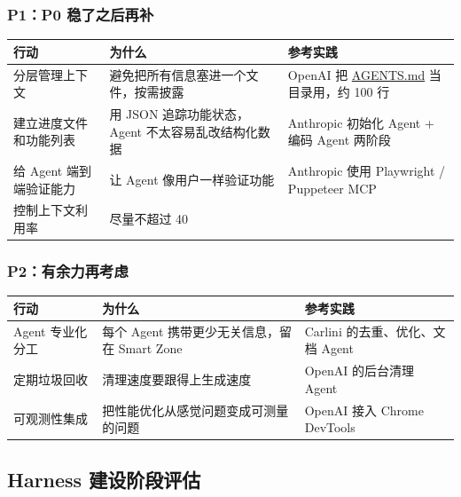 \documentclass[9pt,a4paper,twocolumn]{ctexart}
\begin{document}
\subsubsection{P1：P0 稳了之后再补}

{\footnotesize
\begin{tabular}{|p{}|p{}|p{}|}
\hline
\textbf{行动} & \textbf{为什么} & \textbf{参考实践} \\
\hline
分层管理上下文 & 避免把所有信息塞进一个文件，按需披露 & OpenAI 把 \href{http://agents.md/}{AGENTS.md} 当目录用，约 100 行 \\
\hline
建立进度文件和功能列表 & 用 JSON 追踪功能状态，Agent 不太容易乱改结构化数据 & Anthropic 初始化 Agent + 编码 Agent 两阶段 \\
\hline
给 Agent 端到端验证能力 & 让 Agent 像用户一样验证功能 & Anthropic 使用 Playwright / Puppeteer MCP \\
\hline
控制上下文利用率 & 尽量不超过 40\\%
\hline
\end{tabular}
}



\subsubsection{P2：有余力再考虑}

{\footnotesize
\begin{tabular}{|p{}|p{}|p{}|}
\hline
\textbf{行动} & \textbf{为什么} & \textbf{参考实践} \\
\hline
Agent 专业化分工 & 每个 Agent 携带更少无关信息，留在 Smart Zone & Carlini 的去重、优化、文档 Agent \\
\hline
定期垃圾回收 & 清理速度要跟得上生成速度 & OpenAI 的后台清理 Agent \\
\hline
可观测性集成 & 把性能优化从感觉问题变成可测量的问题 & OpenAI 接入 Chrome DevTools \\
\hline
\end{tabular}
}



\subsection*{Harness 建设阶段评估}
\end{document}
